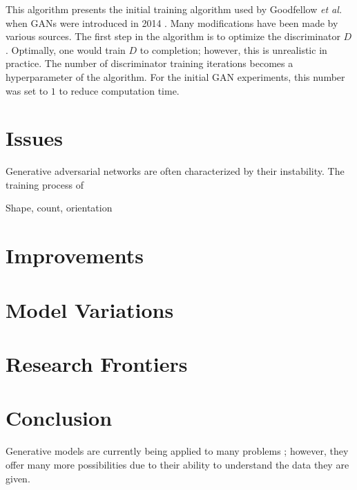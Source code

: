 \documentclass[11pt]{article}
\begin{document}
This algorithm presents the initial training algorithm used by Goodfellow \textit{et al.} when GANs were introduced in 2014 \citep{2014arXiv1406.2661G}. Many modifications have been made by various sources. The first step in the algorithm is to optimize the discriminator $D$. Optimally, one would train $D$ to completion; however, this is unrealistic in practice. The number of discriminator training iterations becomes a hyperparameter of the algorithm. For the initial GAN experiments, this number was set to $1$ to reduce computation time.

\section{Issues}
Generative adversarial networks are often characterized by their instability. The training process of

Shape, count, orientation

\section{Improvements}

\section{Model Variations}

\section{Research Frontiers}

\section{Conclusion}
Generative models are currently being applied to many problems \citep{genmodelingopenai}; however, they offer many more possibilities due to their ability to understand the data they are given.



\end{document}
